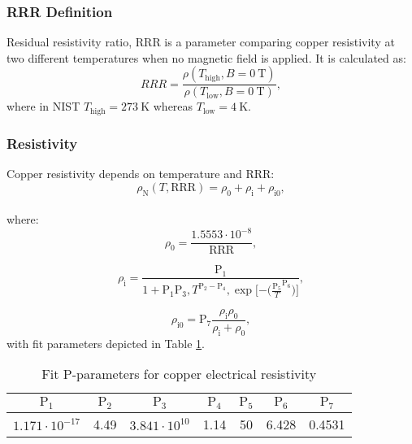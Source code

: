 
\subsubsection{RRR Definition}
Residual resistivity ratio, RRR is a parameter comparing copper resistivity at two different temperatures when no magnetic field is applied. It is calculated as: 
\begin{equation}
RRR = \frac{\rho(T_\text{high}, B=0~\text{T})}{\rho(T_\text{low}, B=0~\text{T})},
\end{equation}
where in NIST $T_\text{high}=273~\text{K}$ whereas $T_\text{low}=4~\text{K}$.

\subsubsection{Resistivity}
Copper resistivity depends on temperature and RRR:
\begin{equation}
    \rho_\text{N}(T, \text{RRR}) = \rho_\text{0}+\rho_\text{i}+\rho_\text{i0},
\end{equation}
\\
where:
\begin{equation}
    \rho_\text{0} = \frac{1.5553\cdot10^{-8}}{\text{RRR}},
\end{equation}

\begin{equation}
    \rho_\text{i} = \frac{\text{P}_\text{1}}{1+\text{P}_\text{1}  \text{P}_\text{3}, T^{\text{P}_\text{2} - \text{P}_\text{4}}, \exp{[-(\frac{\text{P}_\text{5}}{T}}^{\text{P}_\text{6}})]},
\end{equation}

\begin{equation}
    \rho_\text{i0} = \text{P}_\text{7} \frac{\rho_\text{i} \rho_\text{0}}{\rho_\text{i} + \rho_\text{0}},
\end{equation}
with fit parameters depicted in Table \ref{table:nist_resistivity_parameters}. 

\begin{table}[h!]
    \caption{Fit P-parameters for copper electrical resistivity} 
    \vspace{-1.em} 
    \fontsize{10}{10}
    \selectfont 
    \renewcommand{\arraystretch}{1.5}
    \begin{center}
    \begin{tabular}{ ccccccc }  
    \hline
    $\text{P}_1$ & $\text{P}_2$ & $\text{P}_3$ & $\text{P}_4$ & $\text{P}_5$ & $\text{P}_6$ & $\text{P}_7$ \\
    \hline
    $1.171\cdot10^{-17}$ & 4.49 & $3.841\cdot10^{10}$ & 1.14 & 50 & 6.428 & 0.4531 \\
    \hline 
    \end{tabular}
    \end{center}  
     \label{table:nist_resistivity_parameters} 
 \end{table}
 
